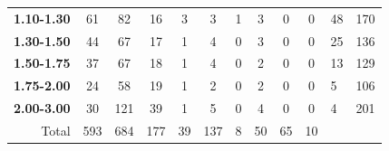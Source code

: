 \begin{table}[]
\begin{tabular}{r|cccccccccll}
\textbf{1.10-1.30}    & 61                          & 82                          & 16                          & 3                        & 3                          & 1                          & 3                          & 0                        & 0                          & 48                   & 170   \\
\textbf{1.30-1.50}    & 44                          & 67                          & 17                          & 1                        & 4                          & 0                          & 3                          & 0                        & 0                          & 25                   & 136   \\
\textbf{1.50-1.75}    & 37                          & 67                          & 18                          & 1                        & 4                          & 0                          & 2                          & 0                        & 0                          & 13                   & 129   \\
\textbf{1.75-2.00}    & 24                          & 58                          & 19                          & 1                        & 2                          & 0                          & 2                          & 0                        & 0                          & 5                    & 106   \\
\textbf{2.00-3.00}    & 30                          & 121                         & 39                          & 1                        & 5                          & 0                          & 4                          & 0                        & 0                          & 4                    & 201   \\ \hline
Total                 & 593                         & 684                         & 177                         & 39                       & 137                        & 8                          & 50                         & 65                       & 10                         & \multicolumn{1}{c}{} &      
\end{tabular}
\end{table}


